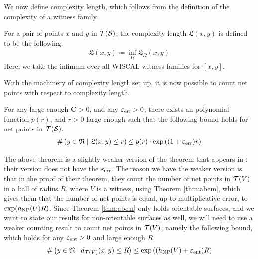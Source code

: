 \documentclass[12pt, reqno]{amsart}
\begin{document}
We now define complexity length, which follows from the definition of the complexity of a witness family.

\begin{definition}
  \label{defn:complexity-length}
  For a pair of points $x$ and $y$ in $\mathcal{T}(\mathcal{S})$, the complexity length $\mathfrak{L}(x,y)$ is defined to be the following.
  \begin{align*}
    \mathfrak{L}(x,y) \coloneqq \inf_{\Omega} \mathfrak{L}_{\Omega}(x,y)
  \end{align*}
  Here, we take the infimum over all WISCAL witness families for $[x,y]$.
\end{definition}

With the machinery of complexity length set up, it is now possible to count net points with respect to complexity length.

\begin{theorem}
  \label{thm:counting-with-complexity}
  For any large enough $\mathbf{C} > 0$, and any $\varepsilon_{\mathrm{err}} > 0$, there exists an polynomial function $p(r)$, and $r > 0$ large enough such that the following bound holds for net points in $\mathcal{T}(\mathcal{S})$.
  \begin{align*}
    \# \left( y \in \mathfrak{N} \mid \mathfrak{L}(x,y) \leq r \right) \leq p(r) \cdot \exp\left( (1+\varepsilon_{\mathrm{err}})r \right)
  \end{align*}
\end{theorem}

\begin{rem}
  The above theorem is a slightly weaker version of the theorem that appears in \textcite{dowdall2023lattice}: their version does not have the $\varepsilon_{\mathrm{err}}$.
  The reason we have the weaker version is that in the proof of their theorem, they count the number of net points in $\mathcal{T}(V)$ in a ball of radius $R$, where $V$ is a witness, using Theorem \ref{thm:abem}, which gives them that the number of net points is equal, up to multiplicative error, to $\exp(h_{\mathrm{NP}}(U) R)$.
  Since Theorem \ref{thm:abem} only holds orientable surfaces, and we want to state our results for non-orientable surfaces as well, we will need to use a weaker counting result to count net points in $\mathcal{T}(V)$, namely the following bound, which holds for any $\varepsilon_{\mathrm{ent}} > 0$ and large enough $R$.
  \begin{align*}
    \#\left( y \in \mathfrak{N} \mid d_{\mathcal{T}(V)}(x, y) \leq R \right) \leq \exp\left( (h_{\mathrm{NP}}(V) + \varepsilon_{\mathrm{ent}} ) R \right)
  \end{align*}
\end{rem}
\end{document}
